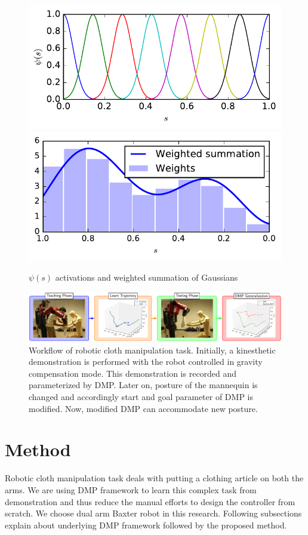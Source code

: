 \documentclass[sigconf]{acmart}
\begin{document}
\begin{figure}
	\includegraphics[width=\linewidth]{gaussian_kernels}
	\includegraphics[width=\linewidth]{weighted_summation}
	\caption{$\psi(s)$ activations and weighted summation of Gaussians}
	\label{fig:psi_activations}
\end{figure}

\begin{figure}
	\includegraphics[width=\linewidth]{flowchart_conf}
	\caption{Workflow of robotic cloth manipulation task. Initially, a kinesthetic demonstration is performed with the robot controlled in gravity compensation mode. This demonstration is recorded and parameterized by DMP. Later on, posture of the mannequin is changed and accordingly start and goal parameter of DMP is modified. Now, modified DMP can accommodate new posture.}
	\label{fig:workflow}
\end{figure}

\section{Method}
\label{sec:method}
Robotic cloth manipulation task deals with putting a clothing article on both the arms. We are using DMP framework to learn this complex task from demonstration and thus reduce the manual efforts to design the controller from scratch. We choose dual arm Baxter robot in this research. Following subsections explain about underlying DMP framework followed by the proposed method.
\end{document}

